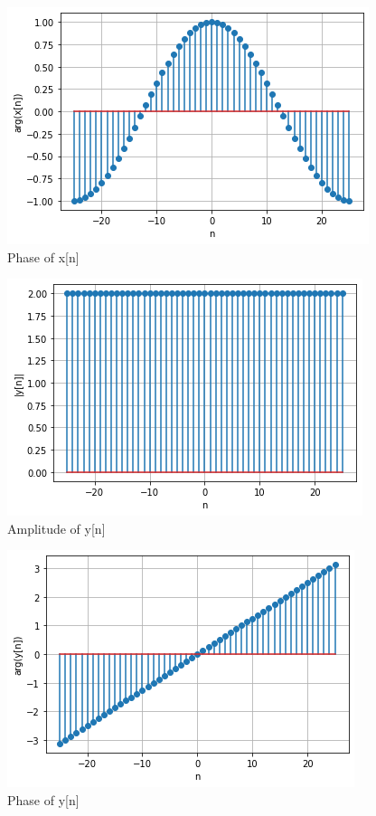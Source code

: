 \documentclass[journal,12pt,twocolumn]{IEEEtran}
\begin{document}
\begin{figure}[!htp]
    \centering
    \includegraphics[width = \columnwidth]{2}
    \caption{Phase of x[n]}
    \label{f2}
\end{figure}
\begin{figure}[!htp]
    \centering
    \includegraphics[width = \columnwidth]{3}
    \caption{Amplitude of y[n]}
    \label{f3}
\end{figure}
\begin{figure}[!htp]
    \centering
    \includegraphics[width = \columnwidth]{4}
    \caption{Phase of y[n]}
    \label{f4}
\end{figure}
\end{document}
